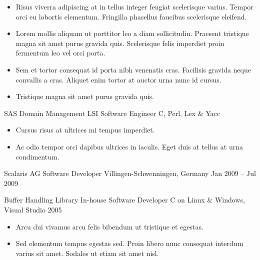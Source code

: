 \documentclass[10pt, a4paper]{sivu}
\begin{document}
            \begin{itemize}
                \item Risus viverra adipiscing at in tellus integer feugiat scelerisque varius. Tempor orci eu lobortis elementum. Fringilla phasellus faucibus scelerisque eleifend.\smallskip
                \item Lorem mollis aliquam ut porttitor leo a diam sollicitudin. Praesent tristique magna sit amet purus gravida quis. Scelerisque felis imperdiet proin fermentum leo vel orci porta.\smallskip
                \item Sem et tortor consequat id porta nibh venenatis cras. Facilisis gravida neque convallis a cras. Aliquet enim tortor at auctor urna nunc id cursus.\smallskip
                \item Tristique magna sit amet purus gravida quis.\smallskip
            \end{itemize}

        \dividergray
        
        \project
            {SAS Domain Management}
            {LSI}
            {Software Engineer}
            {C, Perl, Lex \& Yacc}
        
            \begin{itemize}
                \item Cursus risus at ultrices mi tempus imperdiet. \smallskip
                \item Ac odio tempor orci dapibus ultrices in iaculis. Eget duis at tellus at urna condimentum.\smallskip
            \end{itemize}

\smallskip
\divider
\smallskip

    \company
        {Scalaris AG}
        {Software Developer}
        {Villingen-Schwenningen, Germany}
        {Jan 2009 – Jul 2009}
        
        \project
            {Buffer Handling Library}
            {In-house}
            {Software Developer}
            {C on Linux \& Windows, Visual Studio 2005}
    
            \begin{itemize}
                \item Arcu dui vivamus arcu felis bibendum ut tristique et egestas.\smallskip
                
                \item Sed elementum tempus egestas sed. Proin libero nunc consequat interdum varius sit amet. Sodales ut etiam sit amet nisl.
            \end{itemize}
\end{document}

